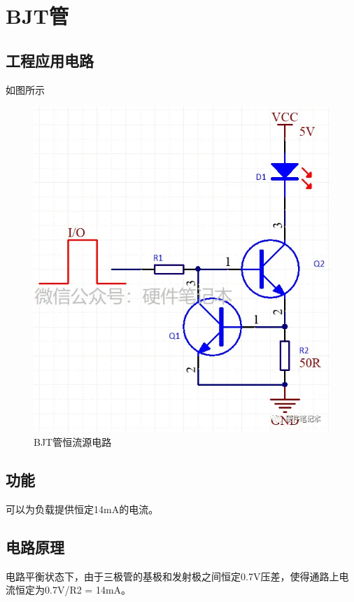 \documentclass[10pt, a4paper]{article} %
\begin{document}
\section{BJT管}
\subsection{工程应用电路}
如图所示
\begin{figure}[ht]
    \centering
    \includegraphics[width=0.8\linewidth]{image/8.png}
    \caption{BJT管恒流源电路}
    \label{fig:bjt_circuit}
\end{figure}

\subsection{功能}
可以为负载提供恒定14mA的电流。

\subsection{电路原理}
电路平衡状态下，由于三极管的基极和发射极之间恒定0.7V压差，使得通路上电流恒定为0.7V/R2 = 14mA。
\end{document}
